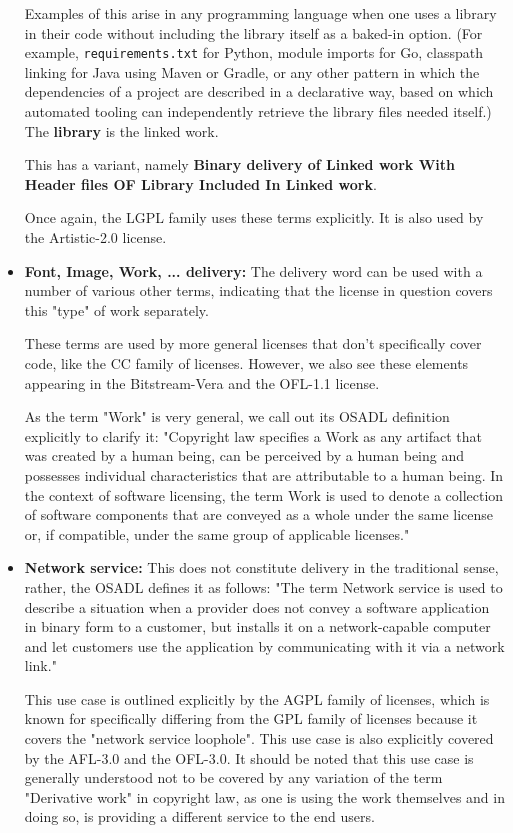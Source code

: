 \begin{itemize}
	Examples of this arise in any programming language when one uses a library in their code without including the library itself as a baked-in option. (For example, \texttt{requirements.txt} for Python, module imports for Go, classpath linking for Java using Maven or Gradle, or any other pattern in which the dependencies of a project are described in a declarative way, based on which automated tooling can independently retrieve the library files needed itself.) The \textbf{library} is the linked work.
	
	This has a variant, namely \textbf{Binary delivery of Linked work With Header files OF Library Included In Linked work}. 
	
	Once again, the LGPL family uses these terms explicitly. It is also used by the Artistic-2.0 license.
	
	\item \textbf{Font, Image, Work, ... delivery:} The delivery word can be used with a number of various other terms, indicating that the license in question covers this "type" of work separately.
	
	These terms are used by more general licenses that don't specifically cover code, like the CC family of licenses. However, we also see these elements appearing in the Bitstream-Vera and the OFL-1.1 license.
	
	As the term "Work" is very general, we call out its OSADL definition explicitly to clarify it: "Copyright law specifies a Work as any artifact that was created by a human being, can be perceived by a human being and possesses individual characteristics that are attributable to a human being. In the context of software licensing, the term Work is used to denote a collection of software components that are conveyed as a whole under the same license or, if compatible, under the same group of applicable licenses."
	
	\item \textbf{Network service:} This does not constitute delivery in the traditional sense, rather, the OSADL defines it as follows: "The term Network service is used to describe a situation when a provider does not convey a software application in binary form to a customer, but installs it on a network-capable computer and let customers use the application by communicating with it via a network link."
	
	This use case is outlined explicitly by the AGPL family of licenses, which is known for specifically differing from the GPL family of licenses because it covers the "network service loophole". This use case is also explicitly covered by the AFL-3.0 and the OFL-3.0. It should be noted that this use case is generally understood not to be covered by any variation of the term "Derivative work" in copyright law, as one is using the work themselves and in doing so, is providing a different service to the end users.
\end{itemize}

